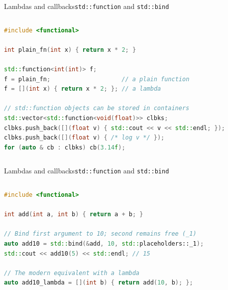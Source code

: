 \begin{frame}[fragile]{Lambdas and callbacks}{\texttt{std::function} and \texttt{std::bind}}
  \begin{columns}
		\begin{lstlisting}[style=codebeamer, language=C++, caption=Storing heterogeneous callables in \texttt{std::function}.]
#include <functional>

int plain_fn(int x) { return x * 2; }

std::function<int(int)> f;
f = plain_fn;                    // a plain function
f = [](int x) { return x * 2; }; // a lambda

// std::function objects can be stored in containers
std::vector<std::function<void(float)>> clbks;
clbks.push_back([](float v) { std::cout << v << std::endl; });
clbks.push_back([](float v) { /* log v */ });
for (auto & cb : clbks) cb(3.14f);
    \end{lstlisting}
	\end{columns}
\end{frame}
\begin{frame}[fragile]{Lambdas and callbacks}{\texttt{std::function} and \texttt{std::bind}}
	\begin{columns}
		\begin{lstlisting}[style=codebeamer, language=C++, caption=\texttt{std::bind} compared to its lambda equivalent.]
#include <functional>

int add(int a, int b) { return a + b; }

// Bind first argument to 10; second remains free (_1)
auto add10 = std::bind(&add, 10, std::placeholders::_1);
std::cout << add10(5) << std::endl; // 15

// The modern equivalent with a lambda
auto add10_lambda = [](int b) { return add(10, b); };
    \end{lstlisting}
	\end{columns}
\end{frame}
